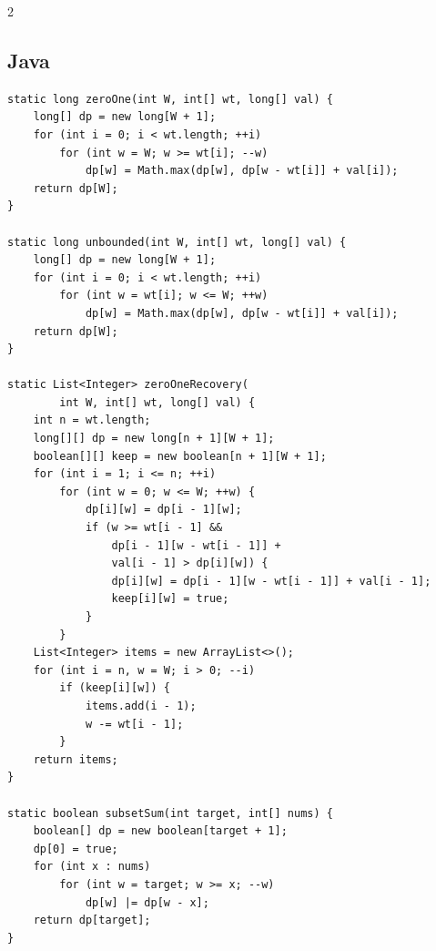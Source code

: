 \documentclass[10pt]{article}
\begin{document}
\begin{multicols}{2}
\subsection{Java}
\begin{framed}
\scriptsize
\begin{verbatim}
static long zeroOne(int W, int[] wt, long[] val) {
    long[] dp = new long[W + 1];
    for (int i = 0; i < wt.length; ++i)
        for (int w = W; w >= wt[i]; --w)
            dp[w] = Math.max(dp[w], dp[w - wt[i]] + val[i]);
    return dp[W];
}

static long unbounded(int W, int[] wt, long[] val) {
    long[] dp = new long[W + 1];
    for (int i = 0; i < wt.length; ++i)
        for (int w = wt[i]; w <= W; ++w)
            dp[w] = Math.max(dp[w], dp[w - wt[i]] + val[i]);
    return dp[W];
}

static List<Integer> zeroOneRecovery(
        int W, int[] wt, long[] val) {
    int n = wt.length;
    long[][] dp = new long[n + 1][W + 1];
    boolean[][] keep = new boolean[n + 1][W + 1];
    for (int i = 1; i <= n; ++i)
        for (int w = 0; w <= W; ++w) {
            dp[i][w] = dp[i - 1][w];
            if (w >= wt[i - 1] &&
                dp[i - 1][w - wt[i - 1]] +
                val[i - 1] > dp[i][w]) {
                dp[i][w] = dp[i - 1][w - wt[i - 1]] + val[i - 1];
                keep[i][w] = true;
            }
        }
    List<Integer> items = new ArrayList<>();
    for (int i = n, w = W; i > 0; --i)
        if (keep[i][w]) {
            items.add(i - 1);
            w -= wt[i - 1];
        }
    return items;
}

static boolean subsetSum(int target, int[] nums) {
    boolean[] dp = new boolean[target + 1];
    dp[0] = true;
    for (int x : nums)
        for (int w = target; w >= x; --w)
            dp[w] |= dp[w - x];
    return dp[target];
}
\end{verbatim}
\end{framed}

\end{multicols}
\newpage
\end{document}
